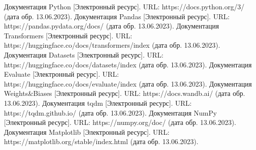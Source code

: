\begin{thebibliography}{00}
     Документация Python [Электронный ресурс]. URL: https://docs.python.org/3/ (дата обр. 13.06.2023).
     Документация Pandas [Электронный ресурс]. URL: https://pandas.pydata.org/docs/ (дата обр. 13.06.2023).
     Документация Transformers [Электронный ресурс]. URL: https://huggingface.co/docs/transformers/index (дата обр. 13.06.2023).
     Документация Datasets [Электронный ресурс]. URL: https://huggingface.co/docs/datasets/index (дата обр. 13.06.2023).
     Документация Evaluate [Электронный ресурс]. URL: https://huggingface.co/docs/evaluate/index (дата обр. 13.06.2023).
     Документация Weights\&Biases [Электронный ресурс]. URL: https://docs.wandb.ai/ (дата обр. 13.06.2023).
     Документация tqdm [Электронный ресурс]. URL: https://tqdm.github.io/ (дата обр. 13.06.2023).
     Документация NumPy [Электронный ресурс]. URL: https://numpy.org/doc/ (дата обр. 13.06.2023).
     Документация Matplotlib [Электронный ресурс]. URL: https://matplotlib.org/stable/index.html (дата обр. 13.06.2023).
   \end{thebibliography}